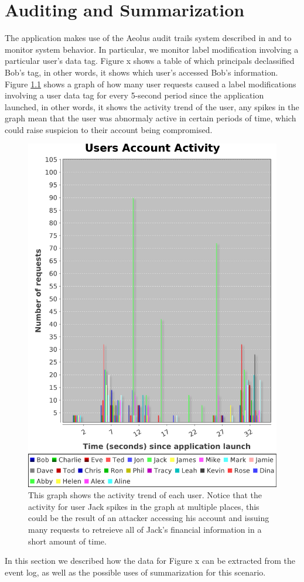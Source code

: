 \chapter{Auditing and Summarization}
\label{mint:auditing}
The application makes use of the Aeolus audit trails system described in \cite{popic} and \cite{blanks} to monitor system behavior. In particular, we monitor label modification involving a particular user's data tag. Figure x shows a table of which principals declassified Bob's tag, in other words, it shows which user's accessed Bob's information. Figure \ref{figure:activity} shows a graph of how many user requests caused a label modifications involving a user data tag for every 5-second period since the application launched, in other words, it shows the activity trend of the user, any spikes in the graph mean that the user was abnormaly active in certain periods of time, which could raise suspicion to their account being compromised.


\begin{figure}
\centering
\includegraphics[width=\textwidth,height=\textheight,keepaspectratio]{figures/activity}
\caption{This graph shows the activity trend of each user. Notice that the activity for user Jack spikes in the graph at multiple places, this could be the result of an attacker accessing his account and issuing many requests to retreieve all of Jack's financial information in a short amount of time.}
\label{figure:activity}
\end{figure}
In this section we described how the data for Figure x can be extracted from the event log, as well as the possible uses of summarization for this scenario.

